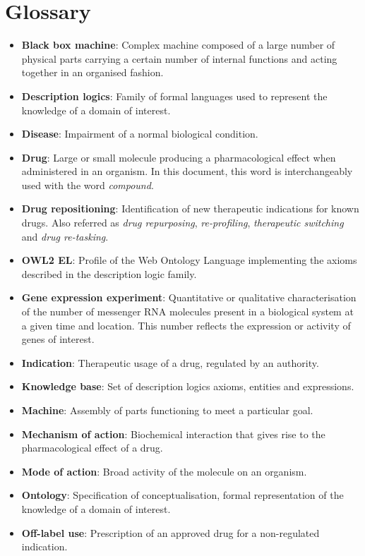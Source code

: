 \appendix
\chapter{Glossary}
\begin{itemize}
  \item \textbf{Black box machine}: Complex machine composed of a large number of physical parts carrying a certain number of internal functions and acting together in an organised fashion.
  \item \textbf{Description logics}: Family of formal languages used to represent the knowledge of a domain of interest.
  \item \textbf{Disease}: Impairment of a normal biological condition.
  \item \textbf{Drug}: Large or small molecule producing a pharmacological effect when administered in an organism. In this document, this word is interchangeably used with the word \emph{compound}.
  \item \textbf{Drug repositioning}: Identification of new therapeutic indications for known drugs. Also referred as \emph{drug repurposing}, \emph{re-profiling}, \emph{therapeutic switching} and \emph{drug re-tasking}.
  \item \textbf{OWL2 EL}: Profile of the Web Ontology Language implementing the axioms described in the description logic  family. 
  \item \textbf{Gene expression experiment}: Quantitative or qualitative characterisation of the number of messenger RNA molecules present in a biological system at a given time and location. This number reflects the expression or activity of genes of interest.
  \item \textbf{Indication}: Therapeutic usage of a drug, regulated by an authority.
  \item \textbf{Knowledge base}: Set of description logics axioms, entities and expressions.
  \item \textbf{Machine}: Assembly of parts functioning to meet a particular goal.
  \item \textbf{Mechanism of action}: Biochemical interaction that gives rise to the pharmacological effect of a drug.
  \item \textbf{Mode of action}: Broad activity of the molecule on an organism.
  \item \textbf{Ontology}: Specification of conceptualisation, formal representation of the knowledge of a domain of interest.
  \item \textbf{Off-label use}: Prescription of an approved drug for a non-regulated indication.

\end{itemize}
